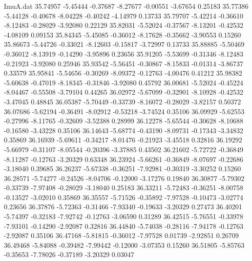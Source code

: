 \begin{filecontents}{ImuA.dat}
  35.74957   -5.45444   -0.37687   -8.27677   -0.00551   -3.67654    0.25183
  35.77386   -5.44128   -0.40678   -8.04228   -0.40242   -4.14979    0.13733
  35.79707   -5.42214   -0.36610   -8.12483   -0.28029   -3.92080    0.22129
  35.82031   -5.52024   -0.37567   -8.13201   -0.42532   -4.08109    0.09153
  35.84345   -5.45085   -0.36012   -8.17628   -0.35662   -3.90553    0.15260
  35.86673   -5.44726   -0.33021   -8.12603   -0.15817   -3.72997    0.13733
  35.88885   -5.50469   -0.36012   -8.13919   -0.14290   -3.95896    0.23656
  35.91205   -5.53699   -0.31346   -8.12483   -0.21923   -3.92080    0.25946
  35.93542   -5.56451   -0.30867   -8.15833   -0.01314   -3.86737    0.33579
  35.95841   -5.54656   -0.30269   -8.09372   -0.12763   -4.00476    0.41212
  35.98382   -5.60638   -0.47019   -8.18345   -0.31846   -3.92080    0.45792
  36.00681   -5.52024   -0.45224   -8.04467   -0.55508   -3.79104    0.44265
  36.02972   -5.67099   -0.32901   -8.10928   -0.42532   -3.47045    0.48845
  36.05387   -5.70449   -0.33739   -8.16072   -0.28029   -3.82157    0.50372
  36.07686   -5.62194   -0.36491   -8.02912   -0.53218   -3.74524    0.35106
  36.09929   -5.62553   -0.27996   -8.11765   -0.32609   -3.52388    0.28999
  36.12278   -5.65544   -0.30628   -8.10688   -0.16580   -3.43228    0.35106
  36.14643   -5.68774   -0.43190   -8.09731   -0.17343   -3.34832    0.35869
  36.16939   -5.69611   -0.34217   -8.01476   -0.21923   -3.45518    0.32816
  36.19292   -5.66979   -0.31107   -8.05544   -0.20396   -3.37885    0.43502
  36.21602   -5.72722   -0.36849   -8.11287   -0.12763   -3.20329    0.63348
  36.23924   -5.66261   -0.36849   -8.07697   -0.22686   -3.18040    0.39685
  36.26237   -5.67338   -0.36251   -7.92981   -0.30319   -3.30252    0.15260
  36.28571   -5.74277   -0.24526   -8.04706   -0.12000   -3.17276    0.19840
  36.30877   -5.79302   -0.33739   -7.97408   -0.28029   -3.18040    0.25183
  36.33211   -5.72483   -0.36251   -8.00758   -0.13527   -3.02010    0.35869
  36.35557   -5.71526   -0.35892   -7.97528   -0.10473   -3.02774    0.23656
  36.37876   -5.72363   -0.31466   -7.93340   -0.19633   -3.20329    0.27473
  36.40201   -5.74397   -0.32183   -7.92742   -0.12763   -3.06590    0.31289
  36.42515   -5.76551   -0.33978   -7.93101   -0.14290   -2.92087    0.32816
  36.44840   -5.74038   -0.28116   -7.94178   -0.12763   -2.92087    0.35106
  36.47168   -5.81815   -0.36012   -7.97528    0.01739   -2.92851    0.26709
  36.49468   -5.84088   -0.39482   -7.99442   -0.12000   -3.07353    0.15260
  36.51805   -5.85763   -0.35653   -7.78026   -0.37189   -3.20329    0.03047

\end{filecontents}
